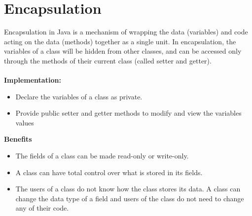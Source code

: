 \documentclass[10pt,a4paper]{book}
\begin{document}
\section{Encapsulation}
Encapsulation in Java is a mechanism of wrapping the data (variables) and code acting on the data (methods) together as a single unit. In encapsulation, the variables of a class will be hidden from other classes, and can be accessed only through the methods of their current class (called setter and getter).\\\\
\textbf{Implementation:}
\begin{itemize}
\item Declare the variables of a class as private.
\item Provide public setter and getter methods to modify and view the variables values
\end{itemize} 
\textbf{Benefits}
\begin{itemize}
\item The fields of a class can be made read-only or write-only.
\item A class can have total control over what is stored in its fields.
\item The users of a class do not know how the class stores its data. A class can change the data type of a field and users of the class do not need to change any of their code.
\end{itemize}
\newpage
\end{document}
